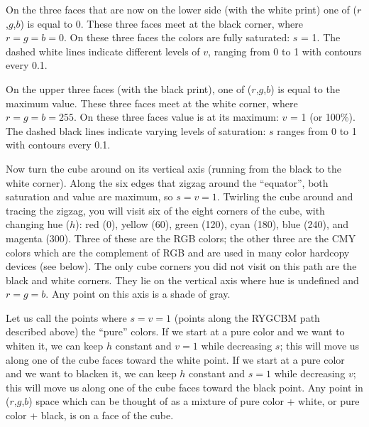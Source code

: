 On the three faces that are now on the lower side (with the white print) one of ($r$,$g$,$b$) is equal to 0. These three faces meet at the black corner, where $r = g = b = 0$. On these three faces the colors are fully saturated: $s$ = 1. The dashed white lines indicate different levels of $v$, ranging from 0 to 1 with contours every 0.1.

On the upper three faces (with the black print), one of ($r$,$g$,$b$) is equal to the
maximum value.  These three faces meet at the white corner, where
$r = g = b = 255$.  On these three faces value is at
its maximum: $v$ = 1 (or 100\%). The dashed black lines indicate varying levels of saturation: $s$ ranges from 0 to
1 with contours every 0.1.

Now turn the cube around on its vertical axis (running from the black to the white corner). Along the six edges that zigzag around the ``equator'', both saturation and value are maximum, so $s = v = 1$. Twirling the cube around and tracing the zigzag, you will visit six of the eight corners of the
cube, with changing hue ($h$):  red (0\DS), yellow (60\DS), green
(120\DS), cyan (180\DS), blue (240\DS), and magenta
(300\DS). Three of these are the RGB colors; the other three
are the CMY colors which are the complement of RGB and are used in many
color hardcopy devices (see below).  The only cube
corners you did not visit on this path are the black and white corners.
They lie on the vertical axis where hue is undefined and $r = g = b$. Any point on this axis is a shade of gray.

Let us call the points where $s = v = 1$ (points along the RYGCBM path described above) the ``pure'' colors.  If we start at a pure color
and we want to whiten it, we can keep $h$ constant and $v = 1$
while decreasing $s$; this will move us along one of the cube
faces toward the white point.  If we start at a pure color and we want
to blacken it, we can keep $h$ constant and $s = 1$ while decreasing
$v$; this will move us along one of the cube faces toward the black
point.  Any point in ($r$,$g$,$b$) space which can be thought of as a
mixture of pure color + white, or pure color + black, is on a face of
the cube.

